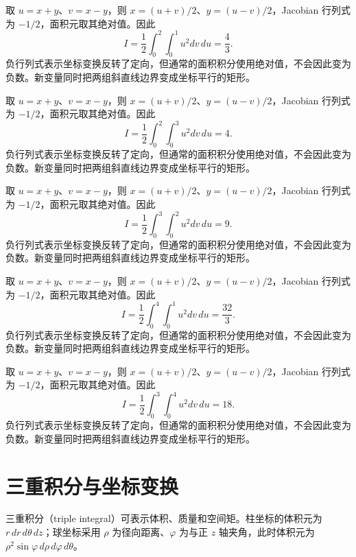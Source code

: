 \documentclass[UTF8,12pt,a4paper,fontset=fandol]{ctexart}
\begin{document}
\begin{solve}\label{ans:c37q20}
取 $u=x+y$、$v=x-y$，则 $x=(u+v)/2$、$y=(u-v)/2$，Jacobian 行列式为 $-1/2$，面积元取其绝对值。因此
\[
I=\frac12\int_0^{2}\int_0^{1}u^2dv\,du=\frac{4}{3}.
\]
负行列式表示坐标变换反转了定向，但通常的面积积分使用绝对值，不会因此变为负数。新变量同时把两组斜直线边界变成坐标平行的矩形。
\end{solve}

\begin{solve}\label{ans:c37q21}
取 $u=x+y$、$v=x-y$，则 $x=(u+v)/2$、$y=(u-v)/2$，Jacobian 行列式为 $-1/2$，面积元取其绝对值。因此
\[
I=\frac12\int_0^{2}\int_0^{3}u^2dv\,du=4.
\]
负行列式表示坐标变换反转了定向，但通常的面积积分使用绝对值，不会因此变为负数。新变量同时把两组斜直线边界变成坐标平行的矩形。
\end{solve}

\begin{solve}\label{ans:c37q22}
取 $u=x+y$、$v=x-y$，则 $x=(u+v)/2$、$y=(u-v)/2$，Jacobian 行列式为 $-1/2$，面积元取其绝对值。因此
\[
I=\frac12\int_0^{3}\int_0^{2}u^2dv\,du=9.
\]
负行列式表示坐标变换反转了定向，但通常的面积积分使用绝对值，不会因此变为负数。新变量同时把两组斜直线边界变成坐标平行的矩形。
\end{solve}

\begin{solve}\label{ans:c37q23}
取 $u=x+y$、$v=x-y$，则 $x=(u+v)/2$、$y=(u-v)/2$，Jacobian 行列式为 $-1/2$，面积元取其绝对值。因此
\[
I=\frac12\int_0^{4}\int_0^{1}u^2dv\,du=\frac{32}{3}.
\]
负行列式表示坐标变换反转了定向，但通常的面积积分使用绝对值，不会因此变为负数。新变量同时把两组斜直线边界变成坐标平行的矩形。
\end{solve}

\begin{solve}\label{ans:c37q24}
取 $u=x+y$、$v=x-y$，则 $x=(u+v)/2$、$y=(u-v)/2$，Jacobian 行列式为 $-1/2$，面积元取其绝对值。因此
\[
I=\frac12\int_0^{3}\int_0^{4}u^2dv\,du=18.
\]
负行列式表示坐标变换反转了定向，但通常的面积积分使用绝对值，不会因此变为负数。新变量同时把两组斜直线边界变成坐标平行的矩形。
\end{solve}

\clearpage
\section{三重积分与坐标变换}\label{sec:ch38}
三重积分（triple integral）可表示体积、质量和空间矩。柱坐标的体积元为 $r\,dr\,d\theta\,dz$；球坐标采用 $\rho$ 为径向距离、$\varphi$ 为与正 $z$ 轴夹角，此时体积元为 $\rho^2\sin\varphi\,d\rho\,d\varphi\,d\theta$。
\end{document}
